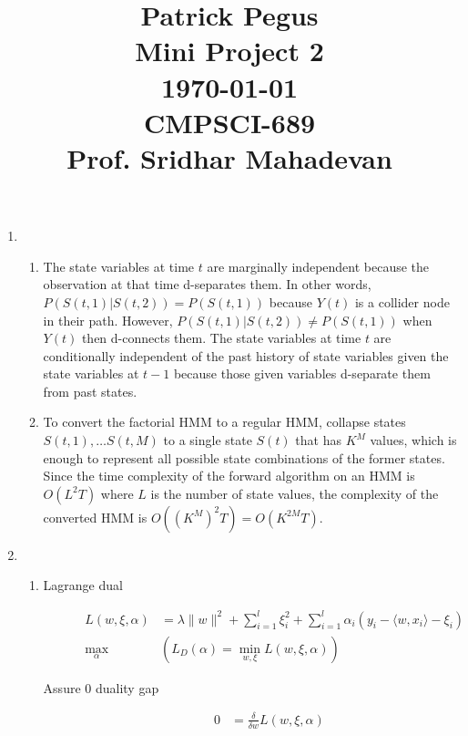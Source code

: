 \documentclass{article}
\newcommand*{\0}{\Vec{0}}
\newcommand*{\al}{\alpha}
\newcommand*{\de}{\delta}
\newcommand*{\la}{\lambda}
\begin{document}
\title
{\begin{flushleft}
\large
Patrick Pegus\\
Mini Project 2\\
\today\\
CMPSCI-689\\
Prof. Sridhar Mahadevan
\end{flushleft}}
\author{}
\date{}
\maketitle
\normalsize
\begin{enumerate}
	\item
		\begin{enumerate}
			\item
				The state variables at time $t$ are marginally independent because the observation at that time d-separates them.
				In other words, $P(S(t,1)|S(t,2)) = P(S(t,1))$ because $Y(t)$ is a collider node in their path.
				However, $P(S(t,1)|S(t,2)) \ne P(S(t,1))$ when $Y(t)$ then d-connects them.
				The state variables at time $t$ are conditionally independent of the past history of state variables given the state variables at $t-1$ because those given variables d-separate them from past states.
			\item
				To convert the factorial HMM to a regular HMM, collapse states $S(t,1),\dots S(t,M)$ to a single state $S(t)$ that has $K^M$ values, which is enough to represent all possible state combinations of the former states.
				Since the time complexity of the forward algorithm on an HMM is $O(L^2T)$ where $L$ is the number of state values, the complexity of the converted HMM is $O\left(\left(K^{M}\right)^2T\right)=O(K^{2M}T)$.
		\end{enumerate}
	\item
		\begin{enumerate}
			\item
				\begin{description}
					\item[Lagrange dual]
						\begin{align*}
							L(w,\xi,\al) &= \la\|w\|^2 +\sum_{i=1}^l\xi_i^2+\sum_{i=1}^l\al_i(y_i - \langle w, x_i \rangle - \xi_i) \\
							\max_\al &\left(L_D(\al) = \min_{w,\xi}L(w,\xi,\al)\right)
						\end{align*}
					\item[Assure 0 duality gap]
						\begin{align*}
							0 &= \frac{\de}{\de w}L(w,\xi,\al)

\end{align*}
\end{description}
\end{enumerate}
\end{enumerate}
\end{document}
